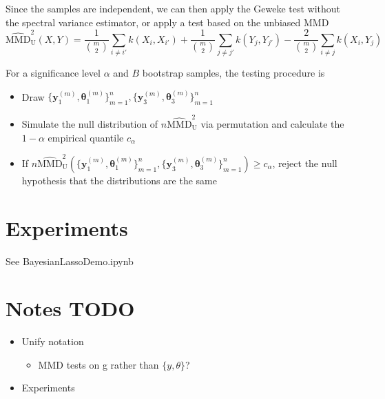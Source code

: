 \documentclass{article}
\begin{document}
Since the samples are independent, we can then apply the Geweke test without the spectral variance estimator, or apply a test based on the unbiased MMD
\begin{equation}
\widehat{\mathrm{MMD}}_{\mathrm{U}}^{2}(X, Y) = \frac{1}{{m\choose 2}} \sum_{i \neq i'} k\left(X_{i}, X_{i'}\right)+\frac{1}{{m\choose 2}} \sum_{j \neq j'} k\left(Y_{j}, Y_{j'}\right)-\frac{2}{{m\choose 2}} \sum_{i \neq j} k\left(X_{i}, Y_{j}\right)
\end{equation}

For a significance level $\alpha$ and $B$ bootstrap samples, the testing procedure is
\begin{itemize}
    \item Draw $\{\mathbf{y}_{1}^{(m)}, \mathbf{\theta}_{1}^{(m)}\}_{m=1}^{n}, \{\mathbf{y}_{3}^{(m)}, \mathbf{\theta}_{3}^{(m)}\}_{m=1}^{n}$
    \item Simulate the null distribution of $n\widehat{\mathrm{MMD}}_{\mathrm{U}}^{2}$ via permutation and calculate the $1-\alpha$ empirical quantile $c_{\alpha}$
    \item If $n\widehat{\mathrm{MMD}}_{\mathrm{U}}^{2}(\{\mathbf{y}_{1}^{(m)}, \mathbf{\theta}_{1}^{(m)}\}_{m=1}^{n}, \{\mathbf{y}_{3}^{(m)}, \mathbf{\theta}_{3}^{(m)}\}_{m=1}^{n}) \geq c_{\alpha}$, reject the null hypothesis that the distributions are the same
\end{itemize}

\section{Experiments}
See BayesianLassoDemo.ipynb

\section{Notes TODO}
\begin{itemize}
    \item Unify notation
    \begin{itemize}
        \item MMD tests on g rather than $\{y, \theta\}$?
    \end{itemize}
    \item Experiments
\end{itemize}
\end{document}
